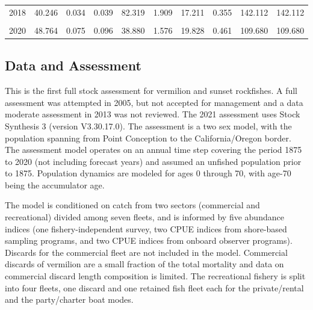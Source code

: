 \documentclass[11pt,
  english,
  a4paper,
]{article}
\begin{document}
\begin{table}[H]
{\begin{tabular}[t]{rrrrrrrrrr}
2018 & 40.246 & 0.034 & 0.039 & 82.319 & 1.909 & 17.211 & 0.355 & 142.112 & 142.112\\
\cellcolor{gray!6}{2019} & \cellcolor{gray!6}{47.217} & \cellcolor{gray!6}{0.291} & \cellcolor{gray!6}{0.045} & \cellcolor{gray!6}{172.463} & \cellcolor{gray!6}{5.296} & \cellcolor{gray!6}{33.640} & \cellcolor{gray!6}{1.020} & \cellcolor{gray!6}{259.971} & \cellcolor{gray!6}{259.971}\\
2020 & 48.764 & 0.075 & 0.096 & 38.880 & 1.576 & 19.828 & 0.461 & 109.680 & 109.680\\
\bottomrule
\end{tabular}}
\end{table}

\FloatBarrier


\hypertarget{data-and-assessment}{%
\subsection*{Data and Assessment}\label{data-and-assessment}}

\leavevmode\tagmcend\tagstructend

This is the first full stock assessment for vermilion and sunset rockfishes. A full assessment was attempted in 2005, but not accepted for management and a data moderate assessment in 2013 was not reviewed. The 2021 assessment uses Stock Synthesis 3 (version V3.30.17.0). The assessment is a two sex model, with the population spanning from Point Conception to the California/Oregon border. The assessment model operates on an annual time step covering the period 1875 to 2020 (not including forecast years) and assumed an unfished population prior to 1875. Population dynamics are modeled for ages 0 through 70, with age-70 being the accumulator age.

The model is conditioned on catch from two sectors (commercial and recreational) divided among seven fleets, and is informed by five abundance indices (one fishery-independent survey, two CPUE indices from shore-based sampling programs, and two CPUE indices from onboard observer programs). Discards for the commercial fleet are not included in the model. Commercial discards of vermilion are a small fraction of the total mortality and data on commercial discard length composition is limited. The recreational fishery is split into four fleets, one discard and one retained fish fleet each for the private/rental and the party/charter boat modes.
\end{document}
